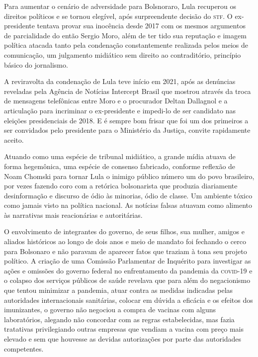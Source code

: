 Para aumentar o cenário de adversidade para Bolsnoraro, Lula recuperou
os direitos políticos e se tornou elegível, após surpreendente decisão
do \textsc{stf}. O ex-presidente tentava provar sua inocência desde 2017 com os
mesmos argumentos de parcialidade do então Sergio Moro, além de ter tido
sua reputação e imagem política atacada tanto pela condenação
constantemente realizada pelos meios de comunicação, um julgamento
midiático sem direito ao contraditório, princípio básico do jornalismo.

A reviravolta da condenação de Lula teve início em 2021, após as
denúncias reveladas pela Agência de Notícias Intercept Brasil que
mostrou através da troca de mensagens telefônicas entre Moro e o
procurador Deltan Dallagnol e a articulação para incriminar o
ex-presidente e impedi-lo de ser candidato nas eleições presidenciais de
2018. E é sempre bom frisar que foi um dos primeiros a ser convidados
pelo presidente para o Ministério da Justiça, convite rapidamente
aceito.

Atuando como uma espécie de tribunal midiático, a grande mídia atuava de
forma hegemônica, uma espécie de consenso fabricado, conforme reflexão
de Noam Chomski para tornar Lula o inimigo público número um do povo
brasileiro, por vezes fazendo coro com a retórica bolsonarista que
produzia diariamente desinformação e discurso de ódio às minorias, ódio
de classe. Um ambiente tóxico como jamais visto na política nacional. As
notícias falsas atuavam como alimento às narrativas mais reacionárias e
autoritárias.

O envolvimento de integrantes do governo, de seus filhos, sua mulher,
amigos e aliados históricos ao longo de dois anos e meio de mandato foi
fechando o cerco para Bolsonaro e não paravam de aparecer fatos que
traziam à tona seu projeto político. A criação de uma Comissão
Parlamentar de Inquérito para investigar as ações e omissões do governo
federal no enfrentamento da pandemia da \textsc{covid-19} e o colapso dos
serviços públicos de saúde revelava que para além do negacionismo que
tentou minimizar a pandemia, atuar contra as medidas indicadas pelas
autoridades internacionais sanitárias, colocar em dúvida a eficácia e os
efeitos dos imunizantes, o governo não negociou a compra de vacinas com
alguns laboratórios, alegando não concordar com as regras estabelecidas,
mas fazia tratativas privilegiando outras empresas que vendiam a vacina
com preço mais elevado e sem que houvesse as devidas autorizações por
parte das autoridades competentes.

